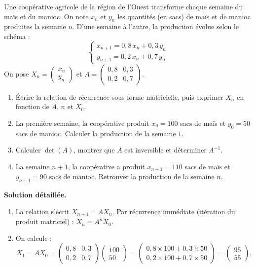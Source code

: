 \documentclass[11pt]{article}
\begin{document}
\begin{exoresolu}
Une coopérative agricole de la région de l'Ouest transforme chaque semaine du maïs et du manioc. On note $x_n$ et $y_n$ les quantités (en sacs) de maïs et de manioc produites la semaine $n$. D'une semaine à l'autre, la production évolue selon le schéma :
\[ \begin{cases} x_{n+1} = {0,8}\,x_n + {0,3}\,y_n \\ y_{n+1} = {0,2}\,x_n + {0,7}\,y_n \end{cases} \]
On pose $X_n = \begin{pmatrix} x_n \\ y_n \end{pmatrix}$ et $A = \begin{pmatrix} {0,8} & {0,3} \\ {0,2} & {0,7} \end{pmatrix}$.
\begin{enumerate}
\item Écrire la relation de récurrence sous forme matricielle, puis exprimer $X_n$ en fonction de $A$, $n$ et $X_0$.
\item La première semaine, la coopérative produit $x_0 = 100$ sacs de maïs et $y_0 = 50$ sacs de manioc. Calculer la production de la semaine $1$.
\item Calculer $\det(A)$, montrer que $A$ est inversible et déterminer $A^{-1}$.
\item La semaine $n+1$, la coopérative a produit $x_{n+1} = 110$ sacs de maïs et $y_{n+1} = 90$ sacs de manioc. Retrouver la production de la semaine $n$.
\end{enumerate}
\tcblower
\textbf{Solution détaillée.}
\begin{enumerate}
\item La relation s'écrit $X_{n+1} = A X_n$. Par récurrence immédiate (itération du produit matriciel) : $X_n = A^n X_0$.
\item On calcule :
\[ X_1 = A X_0 = \begin{pmatrix} {0,8} & {0,3} \\ {0,2} & {0,7} \end{pmatrix} \begin{pmatrix} 100 \\ 50 \end{pmatrix} = \begin{pmatrix} {0,8} \times 100 + {0,3} \times 50 \\ {0,2} \times 100 + {0,7} \times 50 \end{pmatrix} = \begin{pmatrix} 95 \\ 55 \end{pmatrix}. \]

\end{enumerate}
\end{exoresolu}
\end{document}
